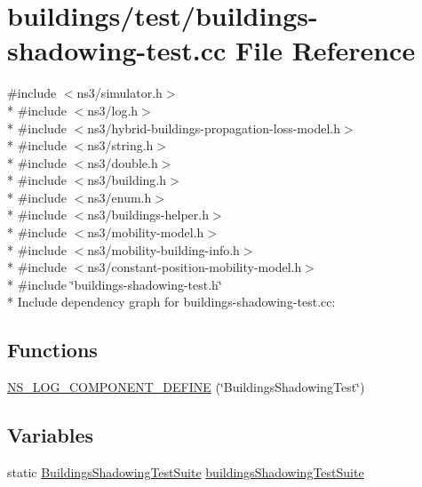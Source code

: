\hypertarget{buildings-shadowing-test_8cc}{}\section{buildings/test/buildings-\/shadowing-\/test.cc File Reference}
\label{buildings-shadowing-test_8cc}
{\ttfamily \#include $<$ns3/simulator.\+h$>$}\\*
{\ttfamily \#include $<$ns3/log.\+h$>$}\\*
{\ttfamily \#include $<$ns3/hybrid-\/buildings-\/propagation-\/loss-\/model.\+h$>$}\\*
{\ttfamily \#include $<$ns3/string.\+h$>$}\\*
{\ttfamily \#include $<$ns3/double.\+h$>$}\\*
{\ttfamily \#include $<$ns3/building.\+h$>$}\\*
{\ttfamily \#include $<$ns3/enum.\+h$>$}\\*
{\ttfamily \#include $<$ns3/buildings-\/helper.\+h$>$}\\*
{\ttfamily \#include $<$ns3/mobility-\/model.\+h$>$}\\*
{\ttfamily \#include $<$ns3/mobility-\/building-\/info.\+h$>$}\\*
{\ttfamily \#include $<$ns3/constant-\/position-\/mobility-\/model.\+h$>$}\\*
{\ttfamily \#include \char`\"{}buildings-\/shadowing-\/test.\+h\char`\"{}}\\*
Include dependency graph for buildings-\/shadowing-\/test.cc\+:
\subsection*{Functions}
\begin{DoxyCompactItemize}
\item 
\hyperlink{buildings-shadowing-test_8cc_a96ae9ff32e006e980cd3ba841b6c1fd6}{N\+S\+\_\+\+L\+O\+G\+\_\+\+C\+O\+M\+P\+O\+N\+E\+N\+T\+\_\+\+D\+E\+F\+I\+NE} (\char`\"{}Buildings\+Shadowing\+Test\char`\"{})
\end{DoxyCompactItemize}
\subsection*{Variables}
\begin{DoxyCompactItemize}
\item 
static \hyperlink{classBuildingsShadowingTestSuite}{Buildings\+Shadowing\+Test\+Suite} \hyperlink{buildings-shadowing-test_8cc_ab9817d9f99f1c5c7dddd9c04e9025e13}{buildings\+Shadowing\+Test\+Suite}
\end{DoxyCompactItemize}


